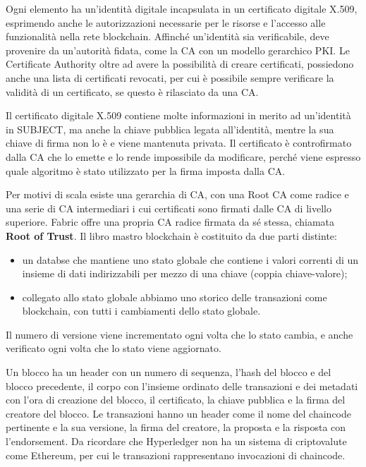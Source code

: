 Ogni elemento ha un'identità digitale incapsulata in un certificato digitale X.509, esprimendo anche le autorizzazioni necessarie per le risorse e l'accesso alle funzionalità nella rete blockchain. Affinché un'identità sia verificabile, deve provenire da un'autorità fidata, come la CA con un modello gerarchico PKI. Le Certificate Authority oltre ad avere la possibilità di creare certificati, possiedono anche una lista di certificati revocati, per cui è possibile sempre verificare la validità di un certificato, se questo è rilasciato da una CA.

Il certificato digitale X.509 contiene molte informazioni in merito ad un'identità in SUBJECT, ma anche la chiave pubblica legata all'identità, mentre la sua chiave di firma non lo è e viene mantenuta privata. Il certificato è controfirmato dalla CA che lo emette e lo rende impossibile da modificare, perché viene espresso quale algoritmo è stato utilizzato per la firma imposta dalla CA.

Per motivi di scala esiste una gerarchia di CA, con una Root CA come radice e una serie di CA intermediari i cui certificati sono firmati dalle CA di livello superiore. Fabric offre una propria CA radice firmata da sé stessa, chiamata \textbf{Root of Trust}. Il libro mastro blockchain è costituito da due parti distinte:
\begin{itemize}
    \item un databse che mantiene uno stato globale che contiene i valori correnti di un insieme di dati indirizzabili per mezzo di una chiave (coppia chiave-valore);
    \item collegato allo stato globale abbiamo uno storico delle transazioni come blockchain, con tutti i cambiamenti dello stato globale.
\end{itemize}
Il numero di versione viene incrementato ogni volta che lo stato cambia, e anche verificato ogni volta che lo stato viene aggiornato.

Un blocco ha un header con un numero di sequenza, l'hash del blocco e del blocco precedente, il corpo con l'insieme ordinato delle transazioni e dei metadati con l'ora di creazione del blocco, il certificato, la chiave pubblica e la firma del creatore del blocco. Le transazioni hanno un header come il nome del chaincode pertinente e la sua versione, la firma del creatore, la proposta e la risposta con l'endorsement. Da ricordare che Hyperledger non ha un sistema di criptovalute come Ethereum, per cui le transazioni rappresentano invocazioni di chaincode.


